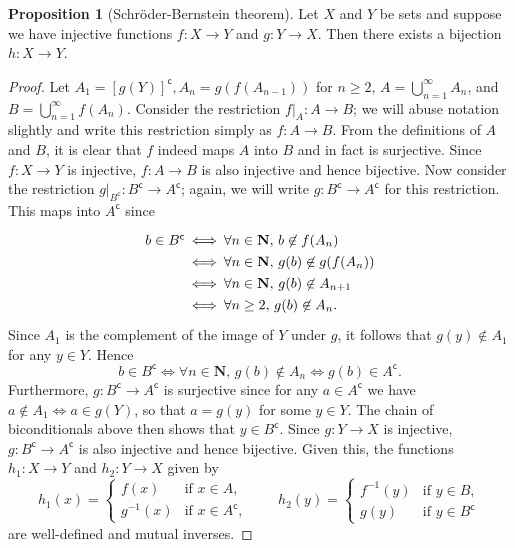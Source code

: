 \documentclass[12pt]{article}
\theoremstyle{definition}
\newtheorem{proposition}[definition]{Proposition}
\newcommand{\setcomp}[1]{#1^{\mathsf{c}}}
\newcommand{\N}{\mathbf{N}}
\begin{document}
\begin{proposition}[Schröder-Bernstein theorem]
\label{prop:schroder-bernstein_theorem}
    Let \( X \) and \( Y \) be sets and suppose we have injective functions \( f : X \to Y \) and \( g : Y \to X \). Then there exists a bijection \( h : X \to Y \).
\end{proposition}

\begin{proof}
    Let \( A_1 = \setcomp{[g(Y)]}, A_n = g(f(A_{n-1})) \) for \( n \geq 2 \), \( A = \bigcup_{n=1}^{\infty} A_n \), and \( B = \bigcup_{n=1}^{\infty} f(A_n) \). Consider the restriction \( f|_A : A \to B \); we will abuse notation slightly and write this restriction simply as \( f : A \to B \). From the definitions of \( A \) and \( B \), it is clear that \( f \) indeed maps \( A \) into \( B \) and in fact is surjective. Since \( f : X \to Y \) is injective, \( f : A \to B \) is also injective and hence bijective. Now consider the restriction \( g|_{\setcomp{B}} : \setcomp{B} \to \setcomp{A} \); again, we will write \( g : \setcomp{B} \to \setcomp{A} \) for this restriction. This maps into \( \setcomp{A} \) since
    \[
        \arraycolsep=1pt\def\arraystretch{1.3}
        \begin{array}{rcl}
            b \in \setcomp{B} & \iff & \forall n \in \N,\, b \not\in f(A_n) \\
            & \iff & \forall n \in \N,\, g(b) \not\in g(f(A_n)) \\
            & \iff & \forall n \in \N,\, g(b) \not\in A_{n+1} \\
            & \iff & \forall n \geq 2,\, g(b) \not\in A_n. \\
        \end{array}
    \]
    Since \( A_1 \) is the complement of the image of \( Y \) under \( g \), it follows that \( g(y) \not\in A_1 \) for any \( y \in Y \). Hence
    \[
        b \in \setcomp{B} \iff \forall n \in \N,\, g(b) \not\in A_n \iff g(b) \in \setcomp{A}.
    \]
    Furthermore, \( g : \setcomp{B} \to \setcomp{A} \) is surjective since for any \( a \in \setcomp{A} \) we have \( a \not\in A_1 \iff a \in g(Y) \), so that \( a = g(y) \) for some \( y \in Y \). The chain of biconditionals above then shows that \( y \in \setcomp{B} \). Since \( g : Y \to X \) is injective, \( g : \setcomp{B} \to \setcomp{A} \) is also injective and hence bijective. Given this, the functions \( h_1 : X \to Y \) and \( h_2 : Y \to X \) given by
    \[
        h_1(x) = \begin{cases}
            f(x) & \text{if } x \in A, \\
            g^{-1}(x) & \text{if } x \in \setcomp{A},
        \end{cases}
        \qquad
        h_2(y) = \begin{cases}
            f^{-1}(y) & \text{if } y \in B, \\
            g(y) & \text{if } y \in \setcomp{B}
        \end{cases}
    \]
    are well-defined and mutual inverses.
\end{proof}
\end{document}
